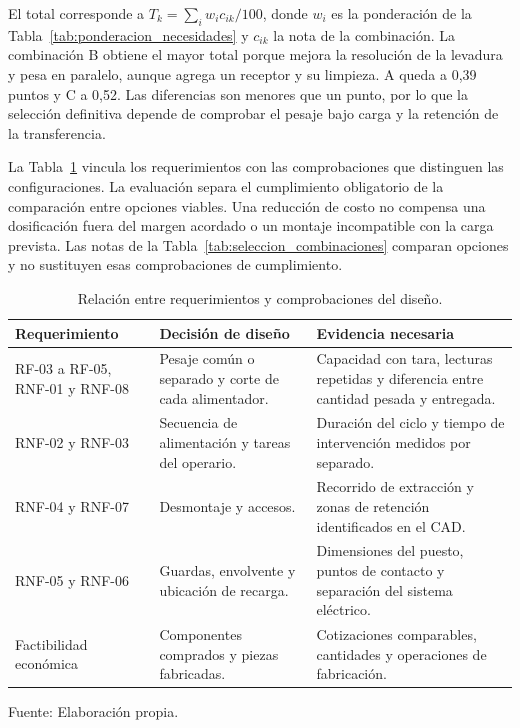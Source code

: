 El total corresponde a \(T_k=\sum_i w_i c_{ik}/100\), donde \(w_i\) es
la ponderación de la Tabla~\ref{tab:ponderacion_necesidades} y \(c_{ik}\)
la nota de la combinación. La combinación B obtiene el mayor total porque
mejora la resolución de la levadura y pesa en paralelo, aunque agrega un
receptor y su limpieza. A queda a 0,39 puntos y C a 0,52. Las diferencias
son menores que un punto, por lo que la selección definitiva depende de
comprobar el pesaje bajo carga y la retención de la transferencia.

La Tabla~\ref{tab:trazabilidad_conceptos} vincula los requerimientos con
las comprobaciones que distinguen las configuraciones. La evaluación
separa el cumplimiento obligatorio de la comparación entre opciones
viables. Una reducción de costo no compensa una dosificación fuera del
margen acordado o un montaje incompatible con la carga prevista.
Las notas de la Tabla~\ref{tab:seleccion_combinaciones} comparan
opciones y no sustituyen esas comprobaciones de cumplimiento.

\begin{table}[H]
    \centering
    \caption{Relación entre requerimientos y comprobaciones del diseño.}
    \label{tab:trazabilidad_conceptos}
    \footnotesize
    \renewcommand{\arraystretch}{1.2}
    \begin{tabularx}{\textwidth}{p{}XX}
        \toprule
        \textbf{Requerimiento} & \textbf{Decisión de diseño} & \textbf{Evidencia necesaria} \\
        \midrule
        RF-03 a RF-05, RNF-01 y RNF-08 & Pesaje común o separado y corte de cada alimentador. & Capacidad con tara, lecturas repetidas y diferencia entre cantidad pesada y entregada. \\
        RNF-02 y RNF-03 & Secuencia de alimentación y tareas del operario. & Duración del ciclo y tiempo de intervención medidos por separado. \\
        RNF-04 y RNF-07 & Desmontaje y accesos. & Recorrido de extracción y zonas de retención identificados en el CAD. \\
        RNF-05 y RNF-06 & Guardas, envolvente y ubicación de recarga. & Dimensiones del puesto, puntos de contacto y separación del sistema eléctrico. \\
        Factibilidad económica & Componentes comprados y piezas fabricadas. & Cotizaciones comparables, cantidades y operaciones de fabricación. \\
        \bottomrule
    \end{tabularx}
    \par\smallskip
    Fuente: Elaboración propia.
\end{table}

